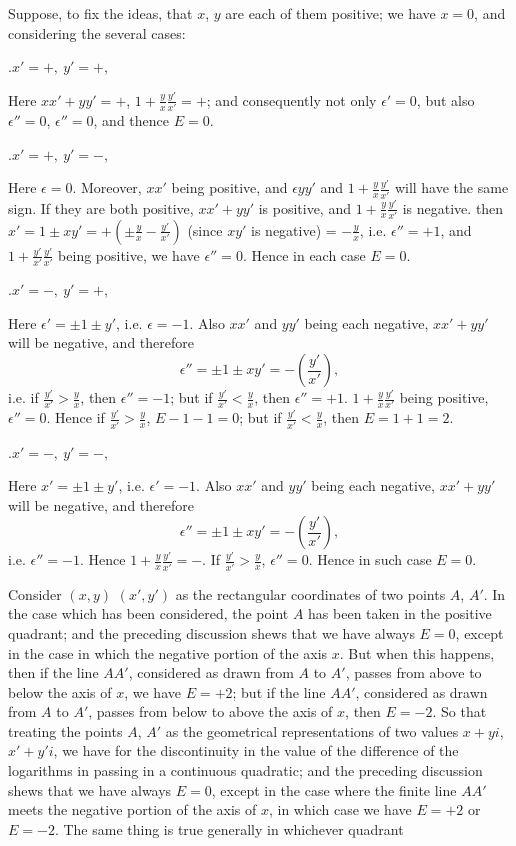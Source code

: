 \documentclass[11pt,a4paper]{book}
\begin{document}
Suppose, to fix the ideas, that $x$, $y$ are each of them positive; we have $x = 0$,
and considering the several cases:

\medskip

.\quad $x' = +,\ y' = +,$

Here $xx' + yy' = +$, $1 + \frac{y}{x}\frac{y'}{x'} = +$; and consequently not only $\epsilon' = 0$, but also $\epsilon'' = 0$,
$\epsilon'' = 0$, and thence $E = 0$.

.\quad $x' = +,\ y' = -,$

Here $\epsilon = 0$. Moreover, $xx'$ being positive, and $\epsilon yy'$ and $1 + \frac{y}{x}\frac{y'}{x'}$ will have the
same sign. If they are both positive, $xx' + yy'$ is positive, and $1 + \frac{y}{x}\frac{y'}{x'}$ is negative.
then $x' = 1 \pm xy' = +(\pm \frac{y}{x} - \frac{y'}{x'})$ (since $xy'$ is negative) = $-\frac{y}{x}$, i.e. $\epsilon'' = +1$, and
$1 + \frac{y'}{x'}\frac{y'}{x'}$ being positive, we have $\epsilon'' = 0$. Hence in each case $E = 0$.

.\quad $x' = -,\ y' = +,$

Here $\epsilon' = \pm 1 \pm y'$, i.e. $\epsilon = -1$. Also $xx'$ and $yy'$ being each negative, $xx' + yy'$
will be negative, and therefore
\[
\epsilon'' = \pm 1 \pm xy' = -\left(\frac{y'}{x'}\right),
\]
i.e. if $\frac{y'}{x'} > \frac{y}{x}$, then $\epsilon'' = -1$; but if $\frac{y'}{x'} < \frac{y}{x}$, then $\epsilon'' = +1$. $1 + \frac{y}{x}\frac{y'}{x'}$ being positive,
$\epsilon'' = 0$. Hence if $\frac{y'}{x'} > \frac{y}{x}$, $E - 1 - 1 = 0$; but if $\frac{y'}{x'} < \frac{y}{x}$, then $E = 1 + 1 = 2$.

.\quad $x' = -,\ y' = -,$

Here $x' = \pm 1 \pm y'$, i.e. $\epsilon' = -1$. Also $xx'$ and $yy'$ being each negative, $xx' + yy'$
will be negative, and therefore
\[
\epsilon'' = \pm 1 \pm xy' = -\left(\frac{y'}{x'}\right),
\]
i.e. $\epsilon'' = -1$. Hence $1 + \frac{y}{x}\frac{y'}{x'} = -$. If $\frac{y'}{x'} > \frac{y}{x}$, $\epsilon'' = 0$. Hence in such case $E = 0$.

\smallskip

Consider $(x, y)$ $(x', y')$ as the rectangular coordinates of two points $A$, $A'$. In
the case which has been considered, the point $A$ has been taken in the positive
quadrant; and the preceding discussion shews that we have always $E = 0$, except in
the case in which the negative portion of the axis $x$. But when this happens, then if
the line $AA'$, considered as drawn from $A$ to $A'$, passes from above to below the
axis of $x$, we have $E = +2$; but if the line $AA'$, considered as drawn from $A$ to $A'$,
passes from below to above the axis of $x$, then $E = -2$. So that treating the points
$A$, $A'$ as the geometrical representations of two values $x + yi$, $x' + y'i$, we have for the
discontinuity in the value of the difference of the logarithms in passing in a continuous
quadratic; and the preceding discussion shews that we have always $E = 0$, except in
the case where the finite line $AA'$ meets the negative portion of the axis of $x$, in
which case we have $E = +2$ or $E = -2$. The same thing is true generally in whichever quadrant
\end{document}
